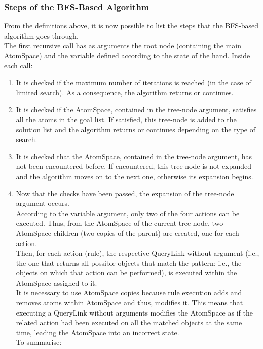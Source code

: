 \subsubsection{Steps of the BFS-Based Algorithm}\label{sec:step_search}

From the definitions above, it is now possible to list the steps that the BFS-based algorithm goes through. \\
The first recursive call has as arguments the root node (containing the main AtomSpace) and the variable defined according to the state of the hand.
Inside each call:

\begin{enumerate}
	\item It is checked if the maximum number of iterations is reached (in the case of limited search). As a consequence, the algorithm returns or continues.
	
	\item It is checked if the AtomSpace, contained in the tree-node argument, satisfies all the atoms in the goal list. If satisfied, this tree-node is added to the solution list and the algorithm returns or continues depending on the type of search.
	
	\item It is checked that the AtomSpace, contained in the tree-node argument, has not been encountered before. If encountered, this tree-node is not expanded and the algorithm moves on to the next one, otherwise its expansion begins.
	
	\item Now that the checks have been passed, the expansion of the tree-node argument occurs. \\
According to the variable argument, only two of the four actions can be executed.
Thus, from the AtomSpace of the current tree-node, two AtomSpace children (two copies of the parent) are created, one for each action. \\
Then, for each action (rule), the respective QueryLink without argument (i.e., the one that returns all possible objects that match the pattern; i.e., the objects on which that action can be performed), is executed within the AtomSpace assigned to it. \\
It is necessary to use AtomSpace copies because rule execution adds and removes atoms within AtomSpace and thus, modifies it. This means that executing a QueryLink without arguments modifies the AtomSpace as if the related action had been executed on all the matched objects at the same time, leading the AtomSpace into an incorrect state. \\
To summarise: 


\end{enumerate}
